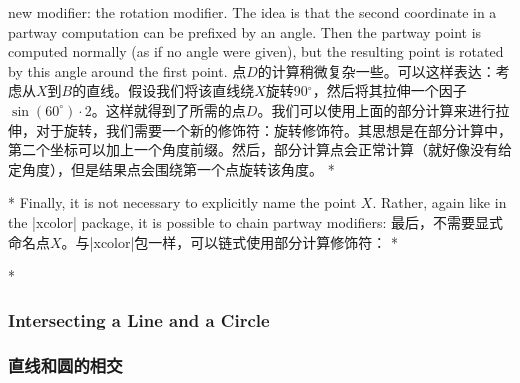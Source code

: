 \begin{paracol}{2}
new modifier: the rotation modifier. The idea is that the second coordinate in
a partway computation can be prefixed by an angle. Then the partway point is
computed normally (as if no angle were given), but the resulting point is
rotated by this angle around the first point.
\switchcolumn
点$D$的计算稍微复杂一些。可以这样表达：考虑从$X$到$B$的直线。假设我们将该直线绕$X$旋转90$^\circ$，然后将其拉伸一个因子$\sin(60^\circ) \cdot 2$。这样就得到了所需的点$D$。我们可以使用上面的部分计算来进行拉伸，对于旋转，我们需要一个新的修饰符：旋转修饰符。其思想是在部分计算中，第二个坐标可以加上一个角度前缀。然后，部分计算点会正常计算（就好像没有给定角度），但是结果点会围绕第一个点旋转该角度。
\switchcolumn[1]*%
\begin{codeexample}[preamble={\usetikzlibrary{calc}}]
\end{codeexample}
\switchcolumn[0]*%
Finally, it is not necessary to explicitly name the point $X$. Rather, again
like in the |xcolor| package, it is possible to chain partway modifiers:
\switchcolumn
最后，不需要显式命名点$X$。与|xcolor|包一样，可以链式使用部分计算修饰符：
\switchcolumn[1]*%
\begin{codeexample}[preamble={\usetikzlibrary{calc}}]
\end{codeexample}


\switchcolumn[0]*%
\subsubsection{Intersecting a Line and a Circle}
\switchcolumn
\subsubsection{直线和圆的相交}


\end{paracol}
